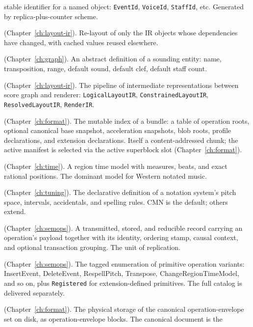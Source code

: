 \documentclass[11pt,letterpaper]{report}
\begin{document}
\begin{description}
    stable identifier for a named object: \texttt{EventId},
    \texttt{VoiceId}, \texttt{StaffId}, etc. Generated by
    replica-plus-counter scheme.
  \item[Incremental layout] (Chapter~\ref{ch:layout-ir}). Re-layout
    of only the IR objects whose dependencies have changed, with
    cached values reused elsewhere.
  \item[Instrument] (Chapter~\ref{ch:graph}). An abstract definition
    of a sounding entity: name, transposition, range, default
    sound, default clef, default staff count.
  \item[Layout IR] (Chapter~\ref{ch:layout-ir}). The pipeline of
    intermediate representations between score graph and renderer:
    \texttt{LogicalLayoutIR}, \texttt{ConstrainedLayoutIR},
    \texttt{ResolvedLayoutIR}, \texttt{RenderIR}.
  \item[Manifest] (Chapter~\ref{ch:format}). The mutable index of a
    bundle: a table of operation roots, optional canonical base
    snapshot, acceleration snapshots, blob roots, profile
    declarations, and extension declarations. Itself a
    content-addressed chunk; the active manifest is selected
    via the active superblock slot
    (Chapter~\ref{ch:format}).
  \item[Metric time] (Chapter~\ref{ch:time}). A region time model
    with measures, beats, and exact rational positions. The
    dominant model for Western notated music.
  \item[Notation grammar] (Chapter~\ref{ch:tuning}). The declarative
    definition of a notation system's pitch space, intervals,
    accidentals, and spelling rules. CMN is the default; others
    extend.
  \item[Operation envelope] (Chapter~\ref{ch:semops}). A
    transmitted, stored, and reducible record carrying an
    operation's payload together with its identity, ordering
    stamp, causal context, and optional transaction grouping.
    The unit of replication.
  \item[Operation kind] (Chapter~\ref{ch:semops}). The tagged
    enumeration of primitive operation variants: InsertEvent,
    DeleteEvent, RespellPitch, Transpose, ChangeRegionTimeModel,
    and so on, plus \texttt{Registered} for extension-defined
    primitives. The full catalog is delivered separately.
  \item[Operation log] (Chapter~\ref{ch:format}). The physical
    storage of the canonical operation-envelope set on disk, as
    operation-envelope blocks. The canonical document is the

\end{description}
\end{document}
